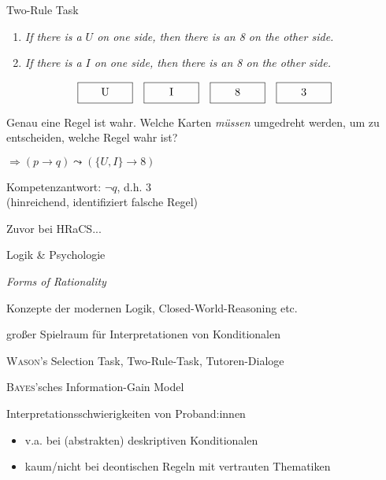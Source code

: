 \begin{frame}{Two-Rule Task {\scriptsize \cite[S.~61-63]{stenningHumanReasoningCognitive2008}}}
    \begin{enumerate}
        \item \emph{If there is a $U$ on one side, then there is an 8 on the other side.}
        \item \emph{If there is a $I$ on one side, then there is an 8 on the other side.}
    \end{enumerate}

    \[
        \framebox[5em][c]{U\strut}\quad
        \framebox[5em][c]{I\strut}\quad
        \framebox[5em][c]{8\strut}\quad
        \framebox[5em][c]{3\strut}
    \]

    Genau eine Regel ist wahr. Welche Karten \emph{müssen} umgedreht werden, um zu entscheiden, welche Regel wahr ist?

    $\Rightarrow (p \to q) \leadsto (\{U, I\} \to 8)$

    Kompetenzantwort: $\lnot q$, d.h. $3$\\
    {\footnotesize (hinreichend, identifiziert falsche Regel)}
\end{frame}


\begin{frame}{Zuvor bei HRaCS...}
    \begin{itemize}
        {
            \color{gray}

            \item Logik \& Psychologie
            \item \emph{Forms of Rationality}
            
            \item Konzepte der modernen Logik, Closed-World-Reasoning etc.
            \item großer Spielraum für Interpretationen von Konditionalen
        }

        \item \textsc{Wason}'s Selection Task, Two-Rule-Task, Tutoren-Dialoge
        \item \textsc{Bayes}'sches Information-Gain Model
        \pause

        \item[$\Rightarrow$] \alert{Interpretationsschwierigkeiten} von Proband:innen
        \begin{itemize}
            \item v.a. bei (abstrakten) deskriptiven Konditionalen
            \item kaum/nicht bei deontischen Regeln mit vertrauten Thematiken
        \end{itemize}
    \end{itemize}
\end{frame}
